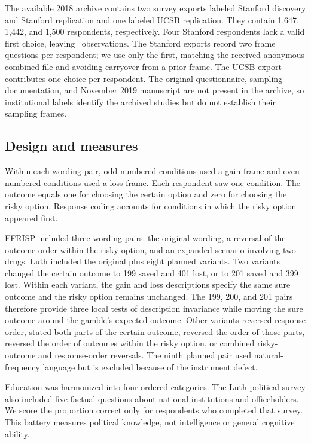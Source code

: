 \documentclass[11pt]{article}
\begin{document}
The available 2018 archive contains two survey exports labeled Stanford discovery and Stanford replication and one labeled UCSB replication. They contain 1,647, 1,442, and 1,500 respondents, respectively. Four Stanford respondents lack a valid first choice, leaving \ProtzkoN\ observations. The Stanford exports record two frame questions per respondent; we use only the first, matching the received anonymous combined file and avoiding carryover from a prior frame. The UCSB export contributes one choice per respondent. The original questionnaire, sampling documentation, and November 2019 manuscript are not present in the archive, so institutional labels identify the archived studies but do not establish their sampling frames.

\subsection{Design and measures}

Within each wording pair, odd-numbered conditions used a gain frame and even-numbered conditions used a loss frame. Each respondent saw one condition. The outcome equals one for choosing the certain option and zero for choosing the risky option. Response coding accounts for conditions in which the risky option appeared first.

FFRISP included three wording pairs: the original wording, a reversal of the outcome order within the risky option, and an expanded scenario involving two drugs. Luth included the original plus eight planned variants. Two variants changed the certain outcome to 199 saved and 401 lost, or to 201 saved and 399 lost. Within each variant, the gain and loss descriptions specify the same sure outcome and the risky option remains unchanged. The 199, 200, and 201 pairs therefore provide three local tests of description invariance while moving the sure outcome around the gamble's expected outcome. Other variants reversed response order, stated both parts of the certain outcome, reversed the order of those parts, reversed the order of outcomes within the risky option, or combined risky-outcome and response-order reversals. The ninth planned pair used natural-frequency language but is excluded because of the instrument defect.

Education was harmonized into four ordered categories. The Luth political survey also included five factual questions about national institutions and officeholders. We score the proportion correct only for respondents who completed that survey. This battery measures political knowledge, not intelligence or general cognitive ability.
\end{document}
